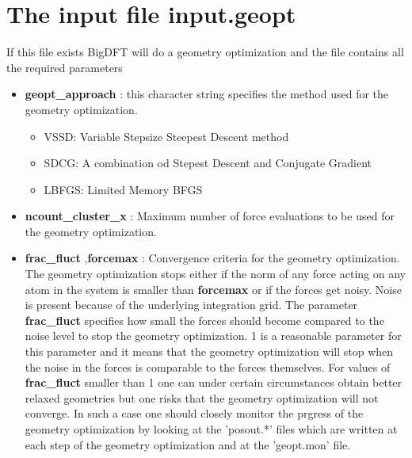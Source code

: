 \documentclass[a4paper,11pt]{report}
\begin{document}
\section{The input file input.geopt}
If this file exists BigDFT will do a geometry optimization and the file contains all the required parameters

\begin{itemize}
\item {\bf geopt\_approach} : this character string specifies the method used for the geometry optimization.
       \begin{itemize}
       \item  VSSD: Variable Stepsize Steepest Descent method
       \item  SDCG: A combination od Stepest Descent and Conjugate Gradient
       \item  LBFGS: Limited Memory BFGS
       \end{itemize}
\item  {\bf  ncount\_cluster\_x} : Maximum number of force evaluations to be used for the geometry optimization.
\item  {\bf frac\_fluct },{\bf forcemax } : Convergence criteria for the geometry optimization. The geometry optimization stops either 
                                           if the norm of any force acting on any atom in the system is smaller than {\bf forcemax } 
                                           or if the forces get noisy. Noise is present because of the underlying integration grid.
                                           The parameter {\bf frac\_fluct } specifies how small the forces should become 
                                           compared to the noise level to stop the geometry optimization. 1 is a reasonable parameter 
                                           for this parameter and it means that the geometry optimization will stop when the noise 
                                           in the forces is comparable to the forces themselves. For values of  {\bf frac\_fluct } 
                                           smaller than 1 one can under certain circumstances obtain better relaxed geometries but 
                                           one risks that the geometry optimization will not converge. In such a case one should 
                                           closely monitor the prgress of the geometry optimization by looking at the 'posout.*' 
                                           files which are written at each step of the geometry optimization and at the 'geopt.mon' file. 

\end{itemize}
\end{document}
